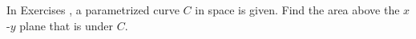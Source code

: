 {\noindent In Exercises}
{, a parametrized curve $C$ in space is given. Find the area above the $x$-$y$ plane that is under $C$.}
